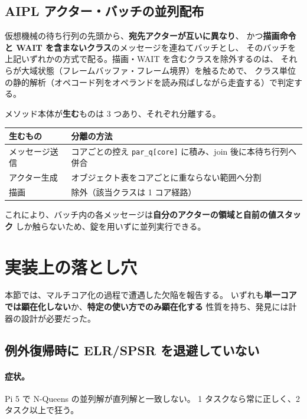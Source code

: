 \documentclass[a4paper,11pt]{ltjsarticle}
\begin{document}
\subsection{AIPL アクター・バッチの並列配布}\label{sec:batch}
仮想機械の待ち行列の先頭から、\textbf{宛先アクターが互いに異なり}、
かつ\textbf{描画命令と WAIT を含まないクラス}のメッセージを連ねてバッチとし、
そのバッチを上記いずれかの方式で配る。描画・WAIT を含むクラスを除外するのは、
それらが大域状態（フレームバッファ・フレーム境界）を触るためで、
クラス単位の静的解析（オペコード列をオペランドを読み飛ばしながら走査する）で判定する。

メソッド本体が\textbf{生む}ものは 3 つあり、それぞれ分離する。

\begin{center}
\begin{tabular}{ll}
\toprule
生むもの & 分離の方法 \\
\midrule
メッセージ送信 & コアごとの控え \texttt{par\_q[core]} に積み、join 後に本待ち行列へ併合 \\
アクター生成 & オブジェクト表をコアごとに重ならない範囲へ分割 \\
描画 & 除外（該当クラスは 1 コア経路） \\
\bottomrule
\end{tabular}
\end{center}

\noindent
これにより、バッチ内の各メッセージは\textbf{自分のアクターの領域と自前の値スタック}
しか触らないため、錠を用いずに並列実行できる。

\section{実装上の落とし穴}\label{sec:pitfall}

本節では、マルチコア化の過程で遭遇した欠陥を報告する。
いずれも\textbf{単一コアでは顕在化しない}か、\textbf{特定の使い方でのみ顕在化する}
性質を持ち、発見には計器の設計が必要だった。

\subsection{例外復帰時に ELR/SPSR を退避していない}\label{sec:elr}
\paragraph{症状。}Pi 5 で N-Queens の並列解が直列解と一致しない。
1 タスクなら常に正しく、2 タスク以上で狂う。
\end{document}

